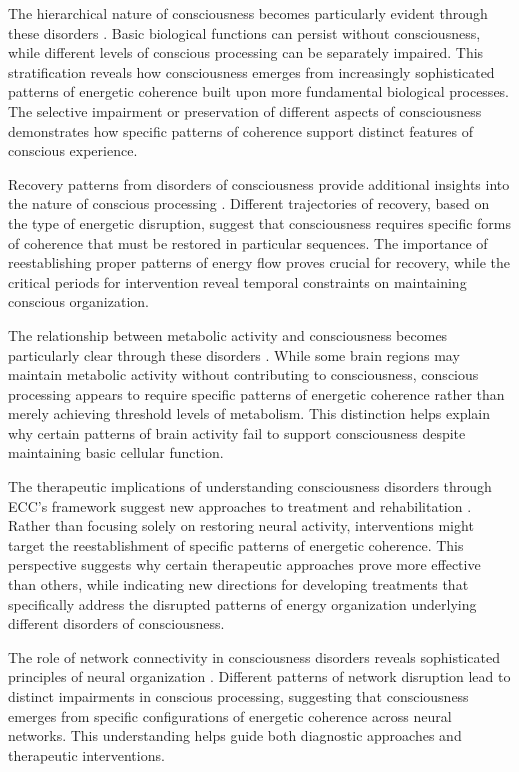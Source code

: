 \begin{refsection}
The hierarchical nature of consciousness becomes particularly evident through these disorders \cite{Baars2005}. Basic biological functions can persist without consciousness, while different levels of conscious processing can be separately impaired. This stratification reveals how consciousness emerges from increasingly sophisticated patterns of energetic coherence built upon more fundamental biological processes. The selective impairment or preservation of different aspects of consciousness demonstrates how specific patterns of coherence support distinct features of conscious experience.

Recovery patterns from disorders of consciousness provide additional insights into the nature of conscious processing \cite{Schiff2010}. Different trajectories of recovery, based on the type of energetic disruption, suggest that consciousness requires specific forms of coherence that must be restored in particular sequences. The importance of reestablishing proper patterns of energy flow proves crucial for recovery, while the critical periods for intervention reveal temporal constraints on maintaining conscious organization.

The relationship between metabolic activity and consciousness becomes particularly clear through these disorders \cite{Massimini2005}. While some brain regions may maintain metabolic activity without contributing to consciousness, conscious processing appears to require specific patterns of energetic coherence rather than merely achieving threshold levels of metabolism. This distinction helps explain why certain patterns of brain activity fail to support consciousness despite maintaining basic cellular function.

The therapeutic implications of understanding consciousness disorders through ECC's framework suggest new approaches to treatment and rehabilitation \cite{Giacino2014}. Rather than focusing solely on restoring neural activity, interventions might target the reestablishment of specific patterns of energetic coherence. This perspective suggests why certain therapeutic approaches prove more effective than others, while indicating new directions for developing treatments that specifically address the disrupted patterns of energy organization underlying different disorders of consciousness.

The role of network connectivity in consciousness disorders reveals sophisticated principles of neural organization \cite{Dehaene2011}. Different patterns of network disruption lead to distinct impairments in conscious processing, suggesting that consciousness emerges from specific configurations of energetic coherence across neural networks. This understanding helps guide both diagnostic approaches and therapeutic interventions.


\end{refsection}
